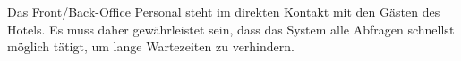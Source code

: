 \documentclass[../../Pflichtenheft.tex]{subfiles}
\begin{document}
    Das Front/Back-Office Personal steht im direkten Kontakt mit den Gästen des Hotels.
    Es muss daher gewährleistet sein, dass das System alle Abfragen schnellst möglich tätigt, um lange Wartezeiten zu verhindern.
\end{document}
